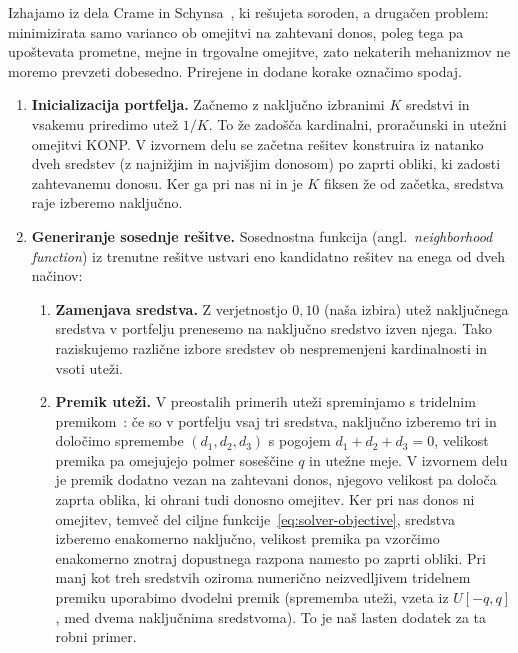 \documentclass[9pt]{style/friteza}
\begin{document}
Izhajamo iz dela Crame in Schynsa~\cite{cramaschyns2003}, ki rešujeta soroden, a drugačen problem: minimizirata samo varianco ob omejitvi na zahtevani donos, poleg tega pa upoštevata prometne, mejne in trgovalne omejitve, zato nekaterih mehanizmov ne moremo prevzeti dobesedno. Prirejene in dodane korake označimo spodaj.

\begin{enumerate}
    \item \textbf{Inicializacija portfelja.}
    Začnemo z naključno izbranimi $K$ sredstvi in vsakemu priredimo utež $1/K$. To že zadošča kardinalni, proračunski in utežni omejitvi KONP. V izvornem delu se začetna rešitev konstruira iz natanko dveh sredstev (z najnižjim in najvišjim donosom) po zaprti obliki, ki zadosti zahtevanemu donosu. Ker ga pri nas ni in je $K$ fiksen že od začetka, sredstva raje izberemo naključno. 

    \item \textbf{Generiranje sosednje rešitve.}
    Sosednostna funkcija (angl.\ \emph{neighborhood function}) iz trenutne rešitve ustvari eno kandidatno rešitev na enega od dveh načinov:
    \begin{enumerate}
        \item \textbf{Zamenjava sredstva.}
        Z verjetnostjo $0{,}10$ (naša izbira) utež naključnega sredstva v portfelju prenesemo na naključno sredstvo izven njega. Tako raziskujemo različne izbore sredstev ob nespremenjeni kardinalnosti in vsoti uteži. 

        \item \textbf{Premik uteži.}
        V preostalih primerih uteži spreminjamo s tridelnim premikom~\cite{cramaschyns2003}: če so v portfelju vsaj tri sredstva, naključno izberemo tri in določimo spremembe $(d_1,d_2,d_3)$ s pogojem $d_1+d_2+d_3=0$, velikost premika pa omejujejo polmer soseščine $q$ in utežne meje. V izvornem delu je premik dodatno vezan na zahtevani donos, njegovo velikost pa določa zaprta oblika, ki ohrani tudi donosno omejitev. Ker pri nas donos ni omejitev, temveč del ciljne funkcije~\eqref{eq:solver-objective}, sredstva izberemo enakomerno naključno, velikost premika pa vzorčimo enakomerno znotraj dopustnega razpona namesto po zaprti obliki. Pri manj kot treh sredstvih oziroma numerično neizvedljivem tridelnem premiku uporabimo dvodelni premik (sprememba uteži, vzeta iz $U[-q,q]$, med dvema naključnima sredstvoma). To je naš lasten dodatek za ta robni primer. 
    \end{enumerate}


\end{enumerate}
\end{document}
